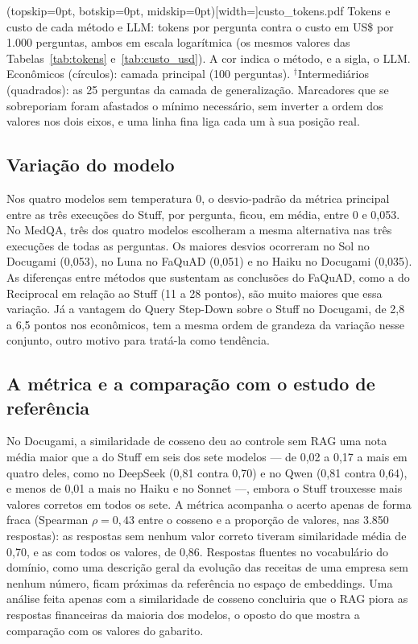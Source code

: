 \Figure[!t](topskip=0pt, botskip=0pt, midskip=0pt)[width=\textwidth]{custo_tokens.pdf}
{Tokens e custo de cada método e LLM: tokens por pergunta contra o custo em US\$ por 1.000 perguntas, ambos em escala logarítmica (os mesmos valores das Tabelas~\ref{tab:tokens} e~\ref{tab:custo_usd}). A cor indica o método, e a sigla, o LLM. Econômicos (círculos): camada principal (100 perguntas). $^\dagger$Intermediários (quadrados): as 25 perguntas da camada de generalização. Marcadores que se sobreporiam foram afastados o mínimo necessário, sem inverter a ordem dos valores nos dois eixos, e uma linha fina liga cada um à sua posição real.\label{fig:custo_tokens}}

\subsection{Variação do modelo}
\label{ssc:variacao}

Nos quatro modelos sem temperatura 0, o desvio-padrão da métrica principal entre as três execuções do Stuff, por pergunta, ficou, em média, entre 0 e 0,053. No MedQA, três dos quatro modelos escolheram a mesma alternativa nas três execuções de todas as perguntas. Os maiores desvios ocorreram no Sol no Docugami (0,053), no Luna no FaQuAD (0,051) e no Haiku no Docugami (0,035). As diferenças entre métodos que sustentam as conclusões do FaQuAD, como a do Reciprocal em relação ao Stuff (11 a 28 pontos), são muito maiores que essa variação. Já a vantagem do Query Step-Down sobre o Stuff no Docugami, de 2,8 a 6,5 pontos nos econômicos, tem a mesma ordem de grandeza da variação nesse conjunto, outro motivo para tratá-la como tendência.

\subsection{A métrica e a comparação com o estudo de referência}
\label{ssc:metrica}

No Docugami, a similaridade de cosseno deu ao controle sem RAG uma nota média maior que a do Stuff em seis dos sete modelos --- de 0,02 a 0,17 a mais em quatro deles, como no DeepSeek (0,81 contra 0,70) e no Qwen (0,81 contra 0,64), e menos de 0,01 a mais no Haiku e no Sonnet ---, embora o Stuff trouxesse mais valores corretos em todos os sete. A métrica acompanha o acerto apenas de forma fraca (Spearman $\rho = 0{,}43$ entre o cosseno e a proporção de valores, nas 3.850 respostas): as respostas sem nenhum valor correto tiveram similaridade média de 0,70, e as com todos os valores, de 0,86. Respostas fluentes no vocabulário do domínio, como uma descrição geral da evolução das receitas de uma empresa sem nenhum número, ficam próximas da referência no espaço de embeddings. Uma análise feita apenas com a similaridade de cosseno concluiria que o RAG piora as respostas financeiras da maioria dos modelos, o oposto do que mostra a comparação com os valores do gabarito.

